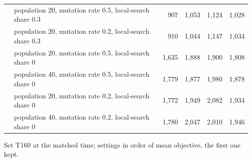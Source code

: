 \begin{table}[!htbp]
\begin{tabular}{l>{\raggedright\arraybackslash}p{}rrrr}
 & population 20, mutation rate 0.5, local-search share 0.3 & 907 & 1{,}053 & 1{,}124 & 1{,}028 \\
 & population 20, mutation rate 0.2, local-search share 0.3 & 910 & 1{,}044 & 1{,}147 & 1{,}034 \\
 & population 20, mutation rate 0.5, local-search share 0 & 1{,}635 & 1{,}888 & 1{,}900 & 1{,}808 \\
 & population 40, mutation rate 0.5, local-search share 0 & 1{,}779 & 1{,}877 & 1{,}980 & 1{,}878 \\
 & population 20, mutation rate 0.2, local-search share 0 & 1{,}772 & 1{,}949 & 2{,}082 & 1{,}934 \\
 & population 40, mutation rate 0.2, local-search share 0 & 1{,}780 & 2{,}047 & 2{,}010 & 1{,}946 \\
\bottomrule
\end{tabular}
\par\smallskip\footnotesize Set T160 at the matched time; settings in order of mean objective, the first one kept.
\end{table}
